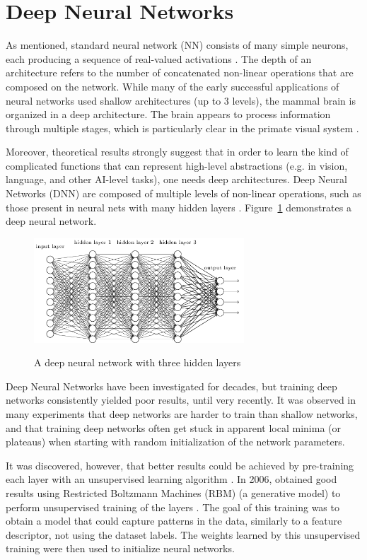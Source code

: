 \section{Deep Neural Networks}
\label{sec:deepcnn}
As mentioned, standard neural network (NN) consists of many simple neurons, each producing a sequence of real-valued activations \cite{deepnn}. The depth of an architecture refers to the number of concatenated non-linear operations that are composed on the network. While many of the early successful applications of neural networks used shallow architectures (up to 3 levels), the mammal brain is organized in a deep architecture. The brain appears to process information through multiple stages, which is particularly clear in the primate visual system \cite{bengio2009learning}.

Moreover, theoretical results strongly suggest that in order to learn the kind of complicated functions that can represent high-level abstractions (e.g. in vision, language, and other AI-level tasks), one needs deep architectures. Deep Neural Networks (DNN) are composed of multiple levels of non-linear operations, such as those present in neural nets with many hidden layers \cite{bengio2009learning}. Figure~\ref{fig:deepl} demonstrates a deep neural network. 

\begin{figure}[H]
	\centering
	{\includegraphics[width=0.7\textwidth]{images/deepnn}}
	\caption{A deep neural network with three hidden layers}
	\label{fig:deepl}
\end{figure}

Deep Neural Networks have been investigated for decades, but training deep networks consistently yielded poor results, until very recently. It was observed in many experiments that deep networks are harder to train than shallow networks, and that training deep networks often get stuck in apparent local minima (or plateaus) when starting with random initialization of the network parameters.

It was discovered, however, that better results could be achieved by pre-training each layer with an unsupervised learning algorithm \cite{hinton2006fast}. In 2006, \citeauthor{hinton2006fast} obtained good results using Restricted Boltzmann Machines (RBM) (a generative model) to perform unsupervised training of the layers \cite{hinton2006fast}. The goal of this training was to obtain a model that could capture patterns in the data, similarly to a feature descriptor, not using the dataset labels. The weights learned by this unsupervised training were then used to initialize neural networks. 

